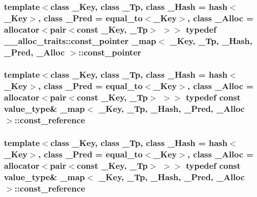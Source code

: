 \subsubsection[{const\+\_\+pointer}]{\setlength{\rightskip}{0pt plus 5cm}template$<$class \+\_\+\+Key, class \+\_\+\+Tp, class \+\_\+\+Hash = hash$<$\+\_\+\+Key$>$, class \+\_\+\+Pred = equal\+\_\+to$<$\+\_\+\+Key$>$, class \+\_\+\+Alloc = allocator$<$pair$<$const \+\_\+\+Key, \+\_\+\+Tp$>$ $>$$>$ typedef \+\_\+\+\_\+alloc\+\_\+traits\+::const\+\_\+pointer {\bf \+\_\+map}$<$ \+\_\+\+Key, \+\_\+\+Tp, \+\_\+\+Hash, \+\_\+\+Pred, \+\_\+\+Alloc $>$\+::{\bf const\+\_\+pointer}}\label{class__map_a12b2f2762c9383a99c0caf9b2f3ec696}
\hypertarget{class__map_afeab752350dfbac51c9a35d67270c99f}{}
\subsubsection[{const\+\_\+reference}]{\setlength{\rightskip}{0pt plus 5cm}template$<$class \+\_\+\+Key, class \+\_\+\+Tp, class \+\_\+\+Hash = hash$<$\+\_\+\+Key$>$, class \+\_\+\+Pred = equal\+\_\+to$<$\+\_\+\+Key$>$, class \+\_\+\+Alloc = allocator$<$pair$<$const \+\_\+\+Key, \+\_\+\+Tp$>$ $>$$>$ typedef const {\bf value\+\_\+type}\& {\bf \+\_\+map}$<$ \+\_\+\+Key, \+\_\+\+Tp, \+\_\+\+Hash, \+\_\+\+Pred, \+\_\+\+Alloc $>$\+::{\bf const\+\_\+reference}}\label{class__map_afeab752350dfbac51c9a35d67270c99f}
\hypertarget{class__map_afeab752350dfbac51c9a35d67270c99f}{}
\subsubsection[{const\+\_\+reference}]{\setlength{\rightskip}{0pt plus 5cm}template$<$class \+\_\+\+Key, class \+\_\+\+Tp, class \+\_\+\+Hash = hash$<$\+\_\+\+Key$>$, class \+\_\+\+Pred = equal\+\_\+to$<$\+\_\+\+Key$>$, class \+\_\+\+Alloc = allocator$<$pair$<$const \+\_\+\+Key, \+\_\+\+Tp$>$ $>$$>$ typedef const {\bf value\+\_\+type}\& {\bf \+\_\+map}$<$ \+\_\+\+Key, \+\_\+\+Tp, \+\_\+\+Hash, \+\_\+\+Pred, \+\_\+\+Alloc $>$\+::{\bf const\+\_\+reference}}\label{class__map_afeab752350dfbac51c9a35d67270c99f}
\hypertarget{class__map_aacdde0553a8fa29ac5cb1678bdf04098}{}
